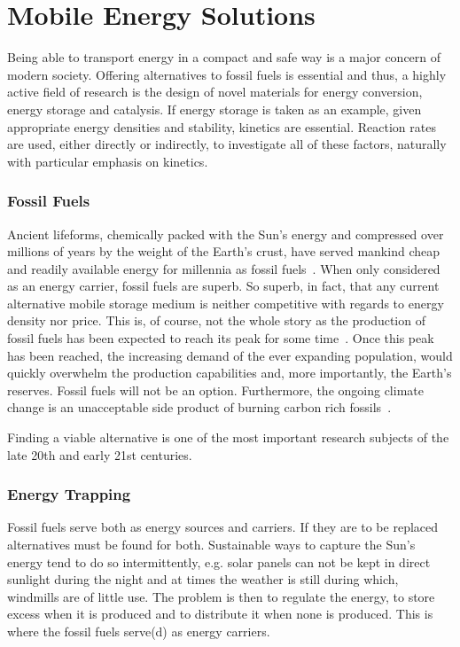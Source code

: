 \section{Mobile Energy Solutions}
Being able to transport energy in a compact and safe way is a major concern of modern society.
Offering alternatives to fossil fuels is essential and thus, a highly active field of research is the design of novel materials for energy conversion, energy storage and catalysis.
If energy storage is taken as an example, given appropriate energy densities and stability, kinetics are essential.
Reaction rates are used, either directly or indirectly, to investigate all of these factors, naturally with particular emphasis on kinetics.

\subsubsection{Fossil Fuels}
Ancient lifeforms, chemically packed with the Sun's energy and compressed over millions of years by the weight of the Earth's crust, have served mankind cheap and readily available energy for millennia as fossil fuels~\cite{early-oil-use}.
When only considered as an energy carrier, fossil fuels are superb.
So superb, in fact, that any current alternative mobile storage medium is neither competitive with regards to energy density nor price.
This is, of course, not the whole story as the production of fossil fuels has been expected to reach its peak for some time~\cite{peak-oil-1956}.
Once this peak has been reached, the increasing demand of the ever expanding population, would quickly overwhelm the production capabilities and, more importantly, the Earth's reserves.
Fossil fuels will not be an option.
Furthermore, the ongoing climate change is an unacceptable side product of burning carbon rich fossils~\cite{climate-change-2007}.

Finding a viable alternative is one of the most important research subjects of the late 20th and early 21st centuries.

\subsubsection{Energy Trapping}
Fossil fuels serve both as energy sources and carriers.
If they are to be replaced alternatives must be found for both.
Sustainable ways to capture the Sun's energy tend to do so intermittently, e.g. solar panels can not be kept in direct sunlight during the night and at times the weather is still during which, windmills are of little use.
The problem is then to regulate the energy, to store excess when it is produced and to distribute it when none is produced.
This is where the fossil fuels serve(d) as energy carriers.

